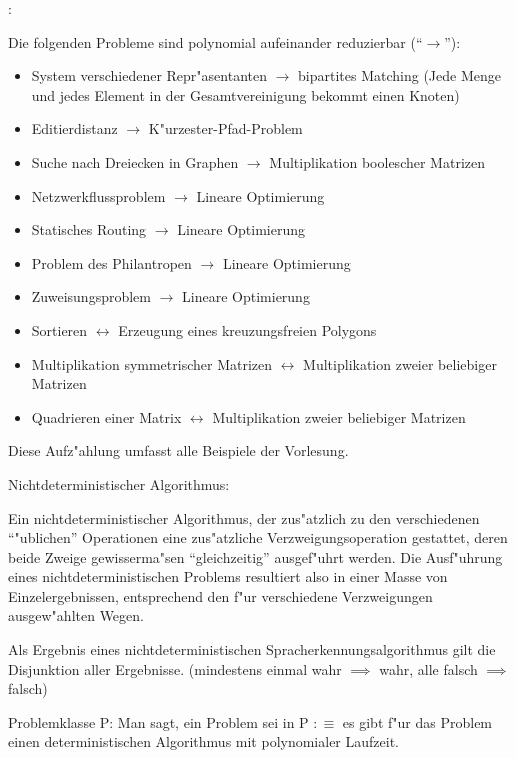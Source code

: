 \example:{
  Die folgenden Probleme sind polynomial aufeinander reduzierbar 
  (``$\rightarrow$''):
  \begin{itemize}
    \item System verschiedener Repr"asentanten 
      $\rightarrow$ bipartites Matching
      (Jede Menge und jedes Element in der Gesamtvereinigung bekommt einen
      Knoten)
    \item Editierdistanz $\rightarrow$ K"urzester-Pfad-Problem
    \item Suche nach Dreiecken in Graphen $\rightarrow$ Multiplikation
      boolescher Matrizen
    \item Netzwerkflussproblem $\rightarrow$ Lineare Optimierung
    \item Statisches Routing $\rightarrow$ Lineare Optimierung
    \item Problem des Philantropen $\rightarrow$ Lineare Optimierung
    \item Zuweisungsproblem $\rightarrow$ Lineare Optimierung
    \item Sortieren $\leftrightarrow$ Erzeugung eines kreuzungsfreien Polygons
    \item Multiplikation symmetrischer Matrizen $\leftrightarrow$
      Multiplikation zweier beliebiger Matrizen
    \item Quadrieren einer Matrix $\leftrightarrow$
      Multiplikation zweier beliebiger Matrizen
  \end{itemize}
  Diese Aufz"ahlung umfasst alle Beispiele der Vorlesung.
}
 Nichtdeterministischer Algorithmus:{
  Ein nichtdeterministischer Algorithmus, der zus"atzlich zu den
  verschiedenen ``"ublichen'' Operationen eine zus"atzliche 
  Verzweigungsoperation gestattet, deren beide Zweige gewisserma"sen
  ``gleichzeitig'' ausgef"uhrt werden. Die Ausf"uhrung eines 
  nichtdeterministischen Problems resultiert also in einer Masse von
  Einzelergebnissen, entsprechend den f"ur verschiedene Verzweigungen
  ausgew"ahlten Wegen.
  
  Als Ergebnis eines nichtdeterministischen Spracherkennungsalgorithmus
  gilt die Disjunktion aller Ergebnisse. 
  (mindestens einmal wahr $\implies$ wahr, alle falsch $\implies$ falsch)
}
 Problemklasse P:{
  Man sagt, ein Problem sei in P $:\equiv$ es gibt f"ur das Problem einen 
  deterministischen Algorithmus mit polynomialer Laufzeit. 
}
